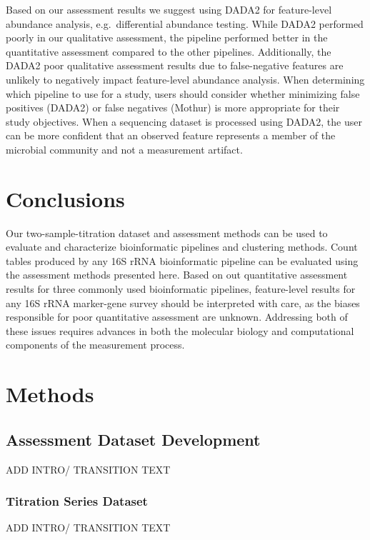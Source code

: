 \documentclass[linenumbers]{bmcart}
\begin{document}
Based on our assessment results we suggest using DADA2 for feature-level abundance analysis, e.g.~differential abundance testing.
While DADA2 performed poorly in our qualitative assessment, the pipeline performed better in the quantitative assessment compared to the other pipelines.
Additionally, the DADA2 poor qualitative assessment results due to false-negative features are unlikely to negatively impact feature-level abundance analysis.
When determining which pipeline to use for a study, users should consider whether minimizing false positives (DADA2) or false negatives (Mothur) is more appropriate for their study objectives.
When a sequencing dataset is processed using DADA2, the user can be more confident that an observed feature represents a member of the microbial community and not a measurement artifact.


\section*{Conclusions}
Our two-sample-titration dataset and assessment methods can be used to evaluate and characterize bioinformatic pipelines and clustering methods.
Count tables produced by any 16S rRNA bioinformatic pipeline can be evaluated using the assessment methods presented here.
Based on out quantitative assessment results for three commonly used bioinformatic pipelines, feature-level results for any 16S rRNA marker-gene survey should be interpreted with care, as the biases responsible for poor quantitative assessment are unknown.
Addressing both of these issues requires advances in both the molecular biology and
computational components of the measurement process.





\section*{Methods}

\subsection*{Assessment Dataset Development}
ADD INTRO/ TRANSITION TEXT

\subsubsection*{Titration Series Dataset}
ADD INTRO/ TRANSITION TEXT
\end{document}
